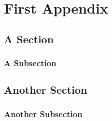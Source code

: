 \chapter{First Appendix}
\section{A Section}
\subsection{A Subsection}
\section{Another Section}
\subsection{Another Subsection}
